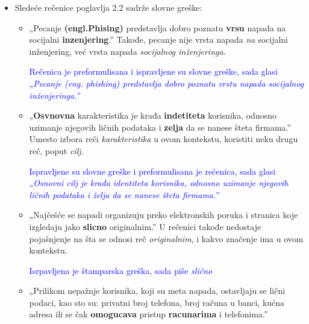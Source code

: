 \documentclass[a4paper]{report}
\newcommand{\odgovor}[1]{\textcolor{blue}{#1}}
\begin{document}
\begin{itemize}
    \item Sledeće rečenice poglavlja 2.2 sadrže slovne greške:
    \begin{itemize}
        \item „Pecanje \textbf{(engl.Phising)} predstavlja dobro poznatu \textbf{vrsu} napada na socijalni \textbf{inzenjering}.”\newline
Takođe, pecanje nije vrsta napada \textit{na} socijalni inženjering, već vrsta napada \textit{socijalnog inženjeringa}.

		\odgovor{Rečenica je preformulisana i ispravljene su slovne greške, sada glasi „\textit{Pecanje (eng. phishing) predstavlja dobro poznatu vrstu napada socijalnog inženjeringa.}”}
		
    \end{itemize}
    \begin{itemize}
    \item „\textbf{Osvnovna} karakteristika je krađa \textbf{indetiteta} korisnika, odnosno uzimanje njegovih ličnih podataka i \textbf{zelja} da se nanese šteta firmama.”
Umesto izbora reči \textit{karakteristika} u ovom kontekstu, koristiti neku drugu reč, poput \textit{cilj}. 
	
	\odgovor{Ispravljene su slovne greške i preformulisana je rečenica, sada glasi „\textit{Osnovni cilj je krađa identiteta korisnika, odnosno uzimanje njegovih ličnih podataka i želja da se nanese šteta firmama.}”}
	
    \end{itemize}
    \begin{itemize}
        \item  „Najčešće se napadi organizuju preko elektronskih poruka i stranica koje izgledaju jako \textbf{slicno} originalnim.”\newline
        U rečenici takođe nedostaje pojašnjenje na šta se odnosi reč  \textit{originalnim}, i kakvo značenje ima u ovom kontekstu.
        
        \odgovor{Isrpavljena je štamparska greška, sada piše \textit{slično}}
        
    \end{itemize}
    \begin{itemize}
        \item „Prilikom nepažnje korisnika, koji su meta
napada, ostavljaju se lični podaci, kao sto su: privatni broj telefona, broj računa u banci, kućna adresa ili se čak \textbf{omogucava} pristup \textbf{racunarima} i telefonima.”
		

\end{itemize}
\end{itemize}
\end{document}

